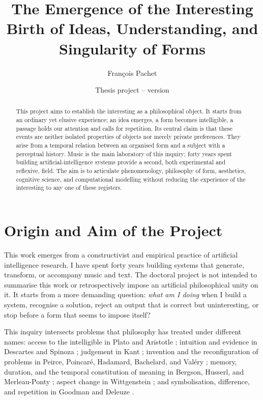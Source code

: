 \documentclass[11pt,a4paper]{article}
\title{The Emergence of the Interesting\\
\large Birth of Ideas, Understanding, and Singularity of Forms}
\author{François Pachet}
\date{Thesis project -- version \projectversion\\\small \projectdate}
\begin{document}
\maketitle

\begin{abstract}
This project aims to establish the interesting as a philosophical object. It
starts from an ordinary yet elusive experience: an idea emerges, a form becomes
intelligible, a passage holds our attention and calls for repetition. Its central
claim is that these events are neither isolated properties of objects nor merely
private preferences. They arise from a temporal relation between an organised
form and a subject with a perceptual history. Music is the main laboratory of
this inquiry; forty years spent building artificial-intelligence systems provide
a second, both experimental and reflexive, field. The aim is to articulate
phenomenology, philosophy of form, aesthetics, cognitive science, and
computational modelling without reducing the experience of the interesting to
any one of these registers.
\end{abstract}

\section{Origin and Aim of the Project}

This work emerges from a constructivist and empirical practice of artificial
intelligence research. I have spent forty years building systems that generate,
transform, or accompany music and text. The doctoral project is not intended to
summarise this work or retrospectively impose an artificial philosophical unity
on it. It starts from a more demanding question: \emph{what am I doing} when I
build a system, recognise a solution, reject an output that is correct but
uninteresting, or stop before a form that seems to impose itself?

This inquiry intersects problems that philosophy has treated under different
names: access to the intelligible in Plato and Aristotle
\parencite{platon2016republique,platon1995theetete,aristote1991metaphysique,aristote2005seconds};
intuition and evidence in Descartes and Spinoza
\parencite{descartes2002regles,descartes1992meditations,spinoza1966ethique};
judgement in Kant \parencite{kant2001raison,kant1993juger}; invention and the
reconfiguration of problems in Peirce, Poincaré, Hadamard, Bachelard, and Valéry
\parencite{peirce1955writings,poincare1908science,hadamard1959invention,bachelard1999formation,valery1973cahiers};
memory, duration, and the temporal constitution of meaning in Bergson, Husserl,
and Merleau-Ponty
\parencite{bergson2013evolution,bergson2013pensee,husserl1970experience,husserl1957logique,merleau1945phenomenologie};
aspect change in Wittgenstein \parencite{wittgenstein2004recherches}; and
symbolisation, difference, and repetition in Goodman and Deleuze
\parencite{goodman1976languages,deleuze1968difference}.
\end{document}
